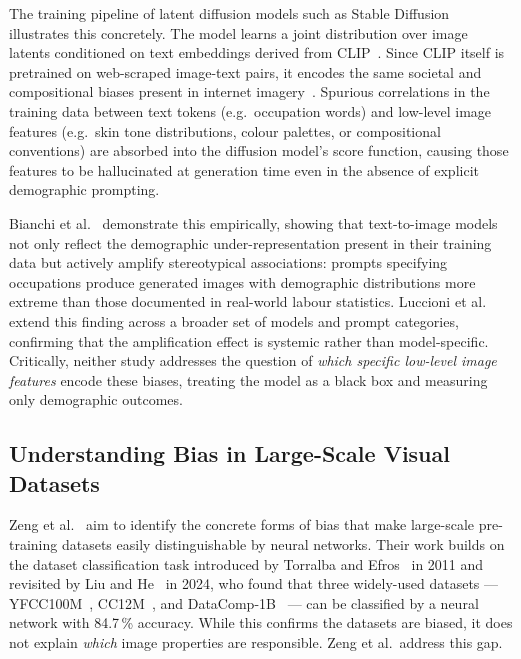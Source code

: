 The training pipeline of latent diffusion models such as Stable
Diffusion~\cite{Rombach_2022_CVPR} illustrates this concretely.  The model learns a joint
distribution over image latents conditioned on text embeddings derived from CLIP~\cite{Radford_2021_CLIP}.
Since CLIP itself is pretrained on web-scraped image-text pairs, it encodes the same
societal and compositional biases present in internet imagery~\cite{Birhane_2021_MultiModalDatasetsMisogynyPornography,
	Schuhmann_2022_Laion5b}.  Spurious correlations in the training data between text tokens
(e.g.\ occupation words) and low-level image features (e.g.\ skin tone distributions, colour
palettes, or compositional conventions) are absorbed into the diffusion model's score
function, causing those features to be hallucinated at generation time even in the absence
of explicit demographic prompting.

Bianchi et al.~\cite{Bianchi_2023_TTIGenAmplifiesDemographicStereotypes} demonstrate this
empirically, showing that text-to-image models not only reflect the demographic
under-representation present in their training data but actively amplify stereotypical
associations: prompts specifying occupations produce generated images with demographic
distributions more extreme than those documented in real-world labour statistics.  Luccioni
et al.~\cite{Luccioni_2023_AnalyzingSocietalRepresentationsDiffusionModels} extend this
finding across a broader set of models and prompt categories, confirming that the amplification
effect is systemic rather than model-specific.  Critically, neither study addresses the
question of \emph{which specific low-level image features} encode these biases, treating the
model as a black box and measuring only demographic outcomes.


\subsection*{Understanding Bias in Large-Scale Visual Datasets}
\label{subsec:zeng2024}

Zeng et al.~\cite{Zeng_2024_UnderstandingBiasinLargeScaleVisualDatasets} aim to identify
the concrete forms of bias that make large-scale pre-training datasets easily distinguishable
by neural networks. Their work builds on the dataset classification task introduced by
Torralba and Efros~\cite{Torralba_2011_UnbiasedLookDatasetBias} in 2011 and revisited by
Liu and He~\cite{Liu_2024_DecadeBattleDatasetBias} in 2024, who found that three widely-used
datasets --- YFCC100M~\cite{Thomee_2016_YFCC100M}, CC12M~\cite{Changpinyo_2021_CC12M}, and
DataComp-1B~\cite{Gadre_2023_DataComp} --- can be classified by a neural network with
84.7\,\% accuracy. While this confirms the datasets are biased, it does not explain
\emph{which} image properties are responsible. Zeng et al.\ address this gap.

